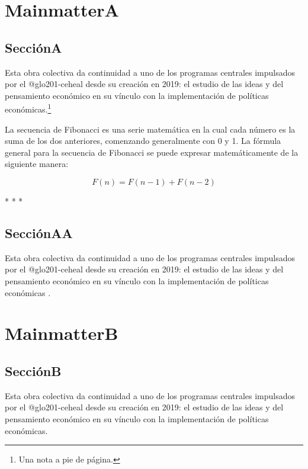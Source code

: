 \mainmatter

\chapter{MainmatterA}

\section{SecciónA}

Esta obra colectiva da continuidad a uno de los programas centrales impulsados por el \gls{@glo201-ceheal} desde su creación en 2019: el estudio de las ideas y del pensamiento económico en su vínculo con la implementación de políticas económicas.\footnote{Una nota a pie de página.}

La secuencia de Fibonacci es una serie matemática en la cual cada número es la suma de los dos anteriores, comenzando generalmente con 0 y 1. La fórmula general para la secuencia de Fibonacci se puede expresar matemáticamente de la siguiente manera:

$$F(n) = F(n-1) + F(n-2)$$

\ifPDF
\froufrou
\else
	\ifBNPDF
	\froufrou
	\else
		\ifODT
		\begin{center} * * * \end{center}
		\fi
	\fi
\fi

\section{SecciónAA}

Esta obra colectiva da continuidad a uno de los programas centrales impulsados por el \gls{@glo201-ceheal} desde su creación en 2019: el estudio de las ideas y del pensamiento económico en su vínculo con la implementación de políticas económicas \parencite{@2761-RODRIGUEZRIVA2019}.

\chapter{MainmatterB}

\section{SecciónB}

Esta obra colectiva da continuidad a uno de los programas centrales impulsados por el \gls{@glo201-ceheal} desde su creación en 2019: el estudio de las ideas y del pensamiento económico en su vínculo con la implementación de políticas económicas.

